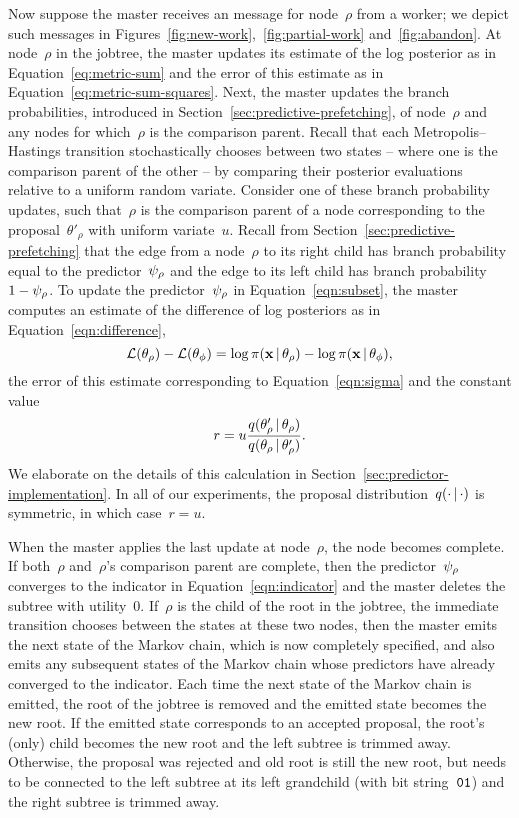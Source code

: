\documentclass[angelino.tex]{subfiles}
\begin{document}
Now suppose the master receives an \UPDATE message for node~$\rho$ from a worker;
we depict such messages in Figures~\ref{fig:new-work},~\ref{fig:partial-work}
and~\ref{fig:abandon}.
%
At node~$\rho$ in the jobtree, the master updates its estimate of the log
posterior as in Equation~\ref{eq:metric-sum} and the error of this estimate
as in Equation~\ref{eq:metric-sum-squares}.
%
Next, the master updates the branch probabilities, introduced in 
Section~\ref{sec:predictive-prefetching},
of node~$\rho$ and any nodes for which~$\rho$ is the comparison parent.
%
Recall that each Metropolis--Hastings transition stochastically chooses between
two states -- where one is the comparison parent of the other -- by comparing
their posterior evaluations relative to a uniform random variate.
%
Consider one of these branch probability updates, such that~$\rho$ is the
comparison parent of a node corresponding to the proposal~$\theta'_\rho$
with uniform variate~$u$.
%
Recall from Section~\ref{sec:predictive-prefetching} that 
the edge from a node~$\rho$ to its right child has branch probability equal to
the predictor~$\psi_{\rho}$ and the edge to its left child has
branch probability~${1 - \psi_{\rho}}$.
%
To update the predictor~$\psi_{\rho}$ in Equation~\ref{eqn:subset},
the master computes an estimate of the difference of log posteriors as in
Equation~\ref{eqn:difference},
\[
{\mathcal{L}}(\theta_\rho) - {\mathcal{L}}(\theta_\phi) =
\log \pi(\mathbf{x} \,|\, \theta_\rho) - \log \pi(\mathbf{x} \,|\, \theta_\phi),
\]
the error of this estimate corresponding to Equation~\ref{eqn:sigma}
and the constant value
\[
r = u \frac{q(\theta'_\rho \,|\, \theta_\rho)}{q(\theta_\rho \,|\, \theta'_\rho)}.
\]
We elaborate on the details of this calculation in Section~\ref{sec:predictor-implementation}.
In all of our experiments, the proposal distribution~$q(\cdot \,|\, \cdot)$ is
symmetric, in which case~$r = u$.

When the master applies the last update at node~$\rho$, the node becomes complete.
If both~$\rho$ and~$\rho$'s comparison parent are complete,
then the predictor~$\psi_{\rho}$ converges to the indicator in
Equation~\ref{eqn:indicator} and the master deletes the subtree with utility~$0$.
If~$\rho$ is the child of the root in the jobtree,
\ie the immediate transition chooses between the states at these two nodes,
then the master emits the next state of the Markov chain, which is now
completely specified, and also emits any subsequent states of the Markov chain
whose predictors have already converged to the indicator.
Each time the next state of the Markov chain is emitted,
the root of the jobtree is removed and the emitted state becomes the new root.
If the emitted state corresponds to an accepted proposal,
the root's (only) child becomes the new root and the left subtree is trimmed away.
Otherwise, the proposal was rejected and old root is still the new root,
but needs to be connected to the left subtree at its left grandchild
(with bit string~$\texttt{01}$) and the right subtree is trimmed away.
\end{document}
